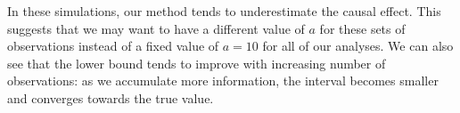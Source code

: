 \documentclass[preprint,12pt]{elsarticle}
\begin{document}
In these simulations, our method tends
to underestimate the causal effect.
This suggests that
we may want to have a different value of $a$ for these sets of observations
instead of a fixed value of $a=10$ for all of our analyses.
We can also see that the lower bound tends to improve
with increasing number of observations: as we accumulate
more information, the interval becomes smaller and converges towards
the true value.

\end{document}
